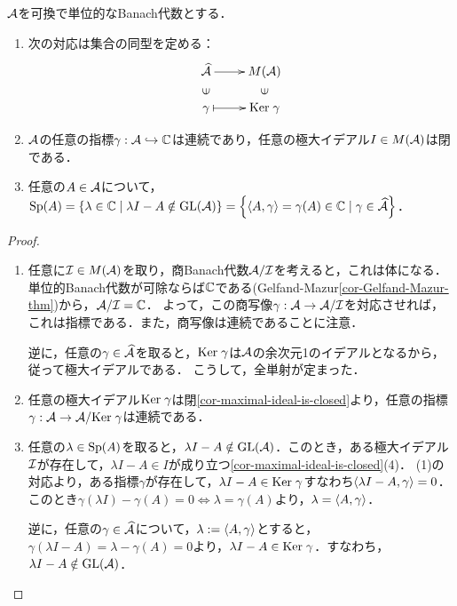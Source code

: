 \documentclass[uplatex,dvipdfmx]{jsreport}
\begin{document}
\begin{proposition}[極大スペクトルとの対応]\label{prop-correspondence-between-maximal-spectrum-and-characters}
    $\mathcal{A}$を可換で単位的なBanach代数とする．
    \begin{enumerate}
        \item 次の対応は集合の同型を定める：
        \[\xymatrix@R-2pc{
            \wh{\A}\ar[r]&M(\A)\\
            \rotatebox[origin=c]{90}{$\in$}&\rotatebox[origin=c]{90}{$\in$}\\
            \gamma\ar@{|->}[r]&\Ker\gamma
        }\]
        \item $\mathcal{A}$の任意の指標$\gamma:\mathcal{A}\hookrightarrow\mathbb{C}$は連続であり，任意の極大イデアル$I\in M(\mathcal{A})$は閉である．
        \item 任意の$A\in\mathcal{A}$について，$\mathrm{Sp}(A)=\left\{\lambda\in\mathbb{C}\mid\lambda I-A\notin\mathrm{GL}(\mathcal{A})\right\}=\left\{\langle A,\gamma\rangle=\gamma(A)\in\mathbb{C}\mid\gamma\in\widehat{\mathcal{A}}\right\}$．
    \end{enumerate}
\end{proposition}
\begin{proof}\mbox{}
    \begin{enumerate}
        \item 任意に$\mathcal{I}\in M(\mathcal{A})$を取り，商Banach代数$\mathcal{A}/\mathcal{I}$を考えると，これは体になる．単位的Banach代数が可除ならば$\mathbb{C}$である(Gelfand-Mazur\ref{cor-Gelfand-Mazur-thm})から，$\mathcal{A}/\mathcal{I}=\mathbb{C}$．
        よって，この商写像$\gamma:\mathcal{A}\to\mathcal{A}/\mathcal{I}$を対応させれば，これは指標である．また，商写像は連続であることに注意．
        
        逆に，任意の$\gamma\in\widehat{\mathcal{A}}$を取ると，$\mathrm{Ker}\;\gamma$は$\mathcal{A}$の余次元1のイデアルとなるから，従って極大イデアルである．
        こうして，全単射が定まった．
        \item 任意の極大イデアル$\mathrm{Ker}\;\gamma$は閉\ref{cor-maximal-ideal-is-closed}より，任意の指標$\gamma:\mathcal{A}\to\mathcal{A}/\mathrm{Ker}\;\gamma$は連続である．
        \item 任意の$\lambda\in\mathrm{Sp}(A)$を取ると，$\lambda I-A\notin\mathrm{GL}(\mathcal{A})$．このとき，ある極大イデアル$\mathcal{I}$が存在して，$\lambda I-A\in I$が成り立つ\ref{cor-maximal-ideal-is-closed}(4)．
        (1)の対応より，ある指標$\gamma$が存在して，$\lambda I-A\in\mathrm{Ker}\;\gamma$すなわち$\langle\lambda I-A,\gamma\rangle=0$．
        このとき$\gamma(\lambda I)-\gamma(A)=0\Leftrightarrow\lambda=\gamma(A)$より，$\lambda=\langle A,\gamma\rangle$．

        逆に，任意の$\gamma\in\widehat{\mathcal{A}}$について，$\lambda:=\langle A,\gamma\rangle$とすると，$\gamma(\lambda I-A)=\lambda-\gamma(A)=0$より，$\lambda I-A\in\mathrm{Ker}\;\gamma$．すなわち，$\lambda I-A\notin\mathrm{GL}(\mathcal{A})$．
    \end{enumerate}
\end{proof}
\end{document}
